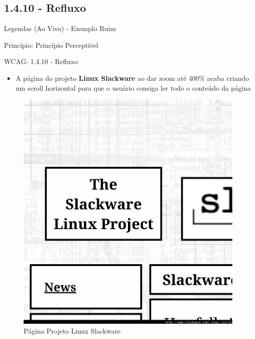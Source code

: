 \documentclass{beamer}
\begin{document}
\subsection{1.4.10 - Refluxo}

\begin{frame}{Legendas (Ao Vivo) - Exemplo Ruim}

Princípio: Princípio Perceptível

WCAG: 1.4.10 - Refluxo

\begin{itemize}
	\item A página do projeto \textbf{Linux Slackware} ao dar zoom até 400\% acaba criando um scroll horizontal para que o usuário consiga ler todo o conteúdo da página
\end{itemize}
\begin{figure}
    \centering
    \includegraphics[scale=0.1]{images/no_refluxo.png}
    \caption{Página Projeto Linux Slackware}
\end{figure}

\end{frame}
\end{document}
